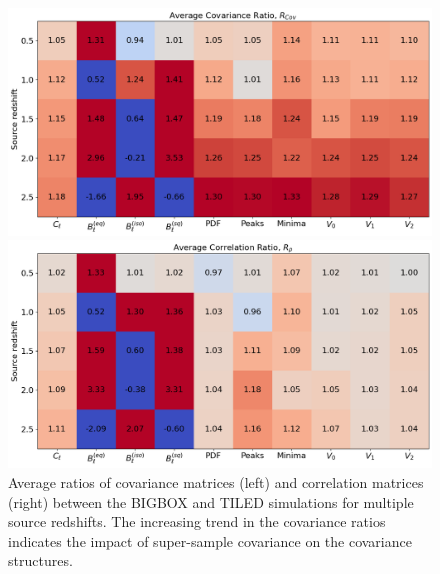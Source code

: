 \begin{figure}[ht]
    \begin{minipage}{0.48\textwidth}
        \centering
        \includegraphics[width=\textwidth]{figures/results/avg_cov_ratio_main.png}
    \end{minipage}
    \begin{minipage}{0.48\textwidth}
        \centering
        \includegraphics[width=\textwidth]{figures/results/avg_corr_ratio_main.png}
    \end{minipage}
    \caption[Average BIGBOX/TILED Ratios of Covariance and Correlation Matrices]{Average ratios of covariance matrices (left) and correlation matrices (right) between the BIGBOX and TILED simulations for multiple source redshifts. The increasing trend in the covariance ratios indicates the impact of super-sample covariance on the covariance structures.}
    \label{fig:avg_main}
\end{figure}

